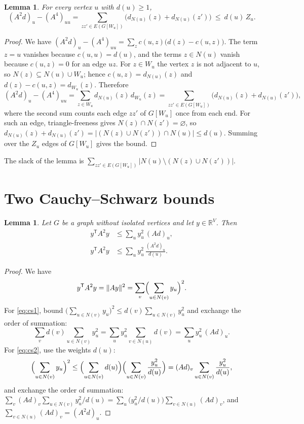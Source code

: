 \documentclass[11pt]{article}
\newtheorem{lemma}[theorem]{Lemma}
\theoremstyle{remark}
\begin{document}
\begin{lemma}\label{lem:count}
For every vertex $u$ with $d(u)\ge1$,
\[
  (A^2d)_u-(A^4)_{uu}
  =\sum_{zz'\in E(G[W_u])}\bigl(d_{N(u)}(z)+d_{N(u)}(z')\bigr)
  \ \le\ d(u)\,Z_u .
\]
\end{lemma}

\begin{proof}
We have $(A^2d)_u-(A^4)_{uu}=\sum_z c(u,z)\bigl(d(z)-c(u,z)\bigr)$. The term $z=u$ vanishes
because $c(u,u)=d(u)$, and the terms $z\in N(u)$ vanish because $c(u,z)=0$ for an edge $uz$. For
$z\in W_u$ the vertex $z$ is not adjacent to $u$, so $N(z)\subseteq N(u)\cup W_u$; hence
$c(u,z)=d_{N(u)}(z)$ and $d(z)-c(u,z)=d_{W_u}(z)$. Therefore
\[
  (A^2d)_u-(A^4)_{uu}=\sum_{z\in W_u}d_{N(u)}(z)\,d_{W_u}(z)
  =\sum_{zz'\in E(G[W_u])}\bigl(d_{N(u)}(z)+d_{N(u)}(z')\bigr),
\]
where the second sum counts each edge $zz'$ of $G[W_u]$ once from each end. For such an edge,
triangle-freeness gives $N(z)\cap N(z')=\varnothing$, so
$d_{N(u)}(z)+d_{N(u)}(z')=|(N(z)\cup N(z'))\cap N(u)|\le d(u)$. Summing over the $Z_u$ edges of
$G[W_u]$ gives the bound.
\end{proof}

The slack of the lemma is $\sum_{zz'\in E(G[W_u])}|N(u)\setminus(N(z)\cup N(z'))|$.

\section{Two Cauchy--Schwarz bounds}

\begin{lemma}\label{lem:cs}
Let $G$ be a graph without isolated vertices and let $y\in\mathbb R^V$. Then
\begin{align}
  y^{\mathsf T}A^2y&\le\sum_u y_u^2\,(Ad)_u, \label{eq:cs1}\\
  y^{\mathsf T}A^2y&\le\sum_u y_u^2\,\frac{(A^2d)_u}{d(u)} . \label{eq:cs2}
\end{align}
\end{lemma}

\begin{proof}
We have
\[
  y^{\mathsf T}A^2y=\|Ay\|^2=\sum_v\Bigl(\sum_{u\in N(v)}y_u\Bigr)^2 .
\]
For \eqref{eq:cs1}, bound $\bigl(\sum_{u\in N(v)}y_u\bigr)^2\le d(v)\sum_{u\in N(v)}y_u^2$ and
exchange the order of summation:
\[
  \sum_v d(v)\sum_{u\in N(v)}y_u^2=\sum_u y_u^2\sum_{v\in N(u)}d(v)=\sum_u y_u^2\,(Ad)_u .
\]
For \eqref{eq:cs2}, use the weights $d(u)$:
\[
  \Bigl(\sum_{u\in N(v)}y_u\Bigr)^2
  \le\Bigl(\sum_{u\in N(v)}d(u)\Bigr)\Bigl(\sum_{u\in N(v)}\frac{y_u^2}{d(u)}\Bigr)
  =(Ad)_v\sum_{u\in N(v)}\frac{y_u^2}{d(u)},
\]
and exchange the order of summation:
$\sum_v(Ad)_v\sum_{u\in N(v)}y_u^2/d(u)=\sum_u\bigl(y_u^2/d(u)\bigr)\sum_{v\in N(u)}(Ad)_v$, and
$\sum_{v\in N(u)}(Ad)_v=(A^2d)_u$.
\end{proof}
\end{document}
